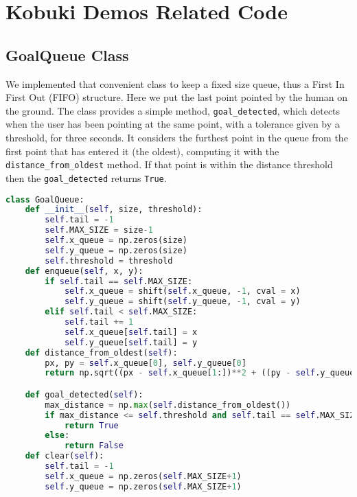 \section*{Kobuki Demos Related Code}
\subsection*{GoalQueue Class}
We implemented that convenient class to keep a fixed size queue, thus a First In First Out (FIFO) structure. Here we put the last point pointed by the human on the ground. The class provides a simple method, \texttt{goal\_detected}, which detects when the user has been pointing at the same point, with a tolerance given by a threshold, for three seconds. It considers the furthest point in the queue from the first point that has entered it (the oldest), computing it with the \texttt{distance\_from\_oldest} method. If that point is within the distance threshold then the \texttt{goal\_detected} returns \texttt{True}.
\begin{lstlisting}[caption={Goal Queue Class},label={lst:goalqueue},language=Python]
class GoalQueue:
    def __init__(self, size, threshold):
        self.tail = -1
        self.MAX_SIZE = size-1
        self.x_queue = np.zeros(size)
        self.y_queue = np.zeros(size)
        self.threshold = threshold
    def enqueue(self, x, y):
        if self.tail == self.MAX_SIZE:
            self.x_queue = shift(self.x_queue, -1, cval = x)
            self.y_queue = shift(self.y_queue, -1, cval = y)
        elif self.tail < self.MAX_SIZE:
            self.tail += 1
            self.x_queue[self.tail] = x
            self.y_queue[self.tail] = y
    def distance_from_oldest(self):
        px, py = self.x_queue[0], self.y_queue[0]
        return np.sqrt((px - self.x_queue[1:])**2 + ((py - self.y_queue[1:]))**2)

    def goal_detected(self):
        max_distance = np.max(self.distance_from_oldest())
        if max_distance <= self.threshold and self.tail == self.MAX_SIZE:
            return True
        else:
            return False
    def clear(self):
        self.tail = -1
        self.x_queue = np.zeros(self.MAX_SIZE+1)
        self.y_queue = np.zeros(self.MAX_SIZE+1)
\end{lstlisting}

